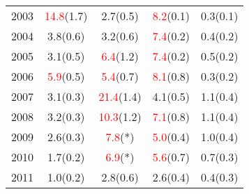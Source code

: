 \documentclass[paperwidth=58in,paperheight=47in,portrait]{baposter}
\begin{document}
\begin{poster}
{\begin{center}
{\begin{tabular}{r|c|c|c|c}
        2003 &  \textcolor{red}{14.8}(1.7) &   2.7(0.5) &   \textcolor{red}{8.2}(0.1) &   0.3(0.1) \\

        2004 &   3.8(0.6) &   3.2(0.6) &   \textcolor{red}{7.4}(0.2) &   0.4(0.2) \\

        2005 &   3.1(0.5) &   \textcolor{red}{6.4}(1.2) &   \textcolor{red}{7.4}(0.2) &   0.5(0.2) \\

        2006 &   \textcolor{red}{5.9}(0.5) &  \textcolor{red}{5.4}(0.7) &   \textcolor{red}{8.1}(0.8) &   0.3(0.2) \\

        2007 &   3.1(0.3) &  \textcolor{red}{21.4}(1.4) &   4.1(0.5) &   1.1(0.4) \\

        2008 &   3.2(0.3) &  \textcolor{red}{10.3}(1.2) &   \textcolor{red}{7.1}(0.8) &   1.1(0.4) \\

        2009 &   2.6(0.3) &        \textcolor{red}{7.8}(*) &   \textcolor{red}{5.0}(0.4) &   1.0(0.4) \\

        2010 &   1.7(0.2) &        \textcolor{red}{6.9}(*) &   \textcolor{red}{5.6}(0.7) &   0.7(0.3) \\

        2011 &   1.0(0.2) &   2.8(0.6) &   2.6(0.4) &   0.4(0.3) \\

\end{tabular}}\end{center}

}

\end{poster}
\end{document}
